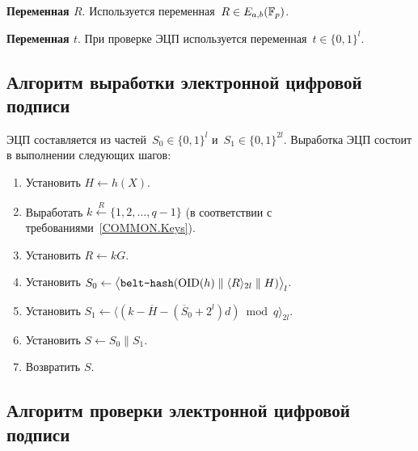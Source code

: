 {\bf Переменная $R$}.
Используется переменная~$R\in E_{a,b}(\mathbb{F}_p)$.

{\bf Переменная $t$}.
При проверке ЭЦП используется переменная~$t\in\{0,1\}^l$.

\subsection{Алгоритм выработки электронной цифровой подписи}
\label{SIGN.Sign}

ЭЦП составляется из частей~$S_0\in\{0,1\}^{l}$ и~$S_1\in\{0,1\}^{2l}$. 
Выработка ЭЦП состоит в выполнении следующих шагов:
\begin{enumerate}
\item
Установить $H\leftarrow h(X)$.

\item
Выработать
$k\stackrel{R}{\leftarrow}\{1,2,\ldots,q-1\}$
(в соответствии с требованиями~\ref{COMMON.Keys}).

\item
Установить $R\leftarrow kG$.

\item
Установить
$S_0\leftarrow 
\bigl\langle
\texttt{belt-hash}
(\text{\normalfont OID}(h)\parallel\langle R\rangle_{2l}\parallel H)
\bigr\rangle_{l}$.

\item
Установить
$S_1\leftarrow\bigl\langle(k-\overline{H}-(\overline{S}_0+2^{l})d)\bmod q
\bigr\rangle_{2l}$.

\item
Установить $S\leftarrow S_0\parallel S_1$.

\item
Возвратить $S$.
\end{enumerate}

\subsection{Алгоритм проверки электронной цифровой подписи}
\label{SIGN.Verify}

